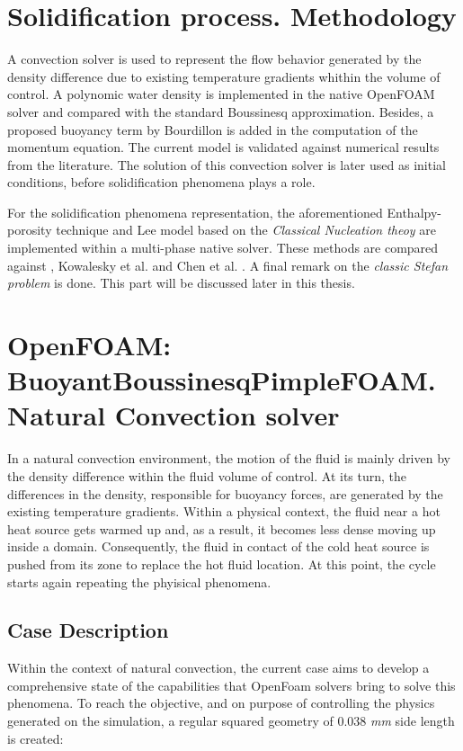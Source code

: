 \section{Solidification process. Methodology}

\setlength{\parindent}{0.5cm} A convection solver is used to represent the flow behavior generated by the density difference due to existing temperature gradients whithin the volume of control. A polynomic water density is implemented in the native OpenFOAM solver and compared with the standard Boussinesq approximation. Besides, a proposed buoyancy term by Bourdillon \cite{bourdillon_2016} is added in the computation of the momentum equation. The current model is validated against numerical results from the literature. The solution of this convection solver is later used as initial conditions, before solidification phenomena plays a role.

\noindent For the solidification phenomena representation, the aforementioned Enthalpy-porosity technique and Lee model based on the \textit{Classical Nucleation theoy} are implemented within a multi-phase native solver. These methods are compared against \cite{bourdillon_2016}, Kowalesky et al. \cite{kowalewski_rebow_1999} and Chen et al. \cite{chen_lee_1998}. A final remark on the \textit{classic Stefan problem} is done. This part will be discussed later in this thesis.

\newpage
\section{OpenFOAM: BuoyantBoussinesqPimpleFOAM. Natural Convection solver}

\setlength{\parindent}{0.5cm} In a natural convection environment, the motion of the fluid is mainly driven by the density difference within the fluid volume of control. At its turn, the differences in the density, responsible for buoyancy forces, are generated by the existing temperature gradients. Within a physical context, the fluid near a hot heat source gets warmed up and, as a result, it becomes less dense moving up inside a domain. Consequently, the fluid in contact of the cold heat source is pushed from its zone to replace the hot fluid location. At this point, the cycle starts again repeating the phyisical phenomena.

\subsection{Case Description}
\setlength{\parindent}{0.5cm} Within the context of natural convection, the current case aims to develop a comprehensive state of the capabilities that OpenFoam solvers bring to solve this phenomena. To reach the objective, and on purpose of controlling the physics generated on the simulation, a regular squared geometry of 0.038 \textit{mm} side length is created:

